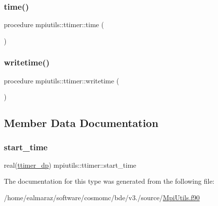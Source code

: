 \mbox{\label{structmpiutils_1_1ttimer_a96e49bfa1d71d98bbd0bab99dcd05a60}} 
\subsubsection{\texorpdfstring{time()}{time()}}
{\footnotesize\ttfamily procedure mpiutils\+::ttimer\+::time (\begin{DoxyParamCaption}{ }\end{DoxyParamCaption})}

\mbox{\label{structmpiutils_1_1ttimer_a10b06e96944b2e20e31da864e70f960b}} 
\subsubsection{\texorpdfstring{writetime()}{writetime()}}
{\footnotesize\ttfamily procedure mpiutils\+::ttimer\+::writetime (\begin{DoxyParamCaption}{ }\end{DoxyParamCaption})}



\subsection{Member Data Documentation}
\mbox{\label{structmpiutils_1_1ttimer_a20d96cb9a3fefe1eca748762d6ac5632}} 
\subsubsection{\texorpdfstring{start\+\_\+time}{start\_time}}
{\footnotesize\ttfamily real(\mbox{\hyperlink{namespacempiutils_a29264c4652e8287096a27ca2675edc26}{ttimer\+\_\+dp}}) mpiutils\+::ttimer\+::start\+\_\+time}



The documentation for this type was generated from the following file\+:\begin{DoxyCompactItemize}
\item 
/home/ealmaraz/software/cosmomc/bde/v3./source/\mbox{\hyperlink{MpiUtils_8f90}{Mpi\+Utils.\+f90}}\end{DoxyCompactItemize}
